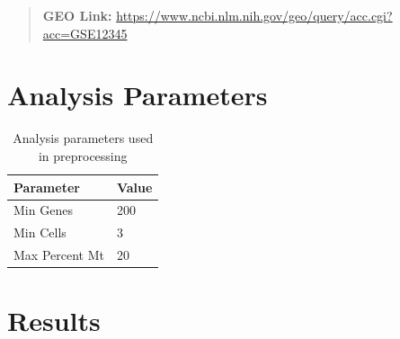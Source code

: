 \documentclass[12pt]{article}
\begin{document}
\begin{quote}
    \textbf{GEO Link:} \url{https://www.ncbi.nlm.nih.gov/geo/query/acc.cgi?acc=GSE12345}
\end{quote}

\section{Analysis Parameters}
\begin{table}[H]
    \centering
    \begin{tabular}{ll}
        \toprule
        \textbf{Parameter} & \textbf{Value} \\
        \midrule
        Min Genes & 200 \\
        Min Cells & 3 \\
        Max Percent Mt & 20 \\

        \bottomrule
    \end{tabular}
    \caption{Analysis parameters used in preprocessing}
    \label{tab:parameters}
\end{table}

\section{{Results}}
\end{document}
